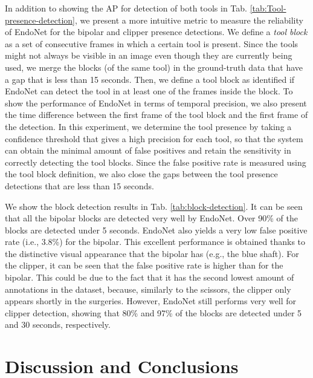 \documentclass[journal]{IEEEtran} \usepackage{amssymb}
\begin{document}
In addition to showing the AP for detection of both tools in Tab. \ref{tab:Tool-presence-detection}, 
we present a more intuitive metric to measure the reliability of EndoNet 
for the bipolar and clipper presence detections. We define a \textit{tool block} as a set of consecutive 
frames in which a certain tool is present.  Since the tools might not always 
be visible in an image even though they are currently being used, we merge the blocks (of the same tool) in the ground-truth data that have a gap that is less than 15 seconds. 
Then, we define a tool block as identified if EndoNet can detect the tool in 
at least one of the frames inside the block. To show the performance of 
EndoNet in terms of temporal precision, we also present the time difference between the 
first frame of the tool block and the first frame of the detection. 
In this experiment, we determine the tool presence by taking a confidence threshold that 
gives a high precision for each tool, so that the system can obtain the 
minimal amount of false positives and retain the sensitivity in correctly detecting 
the tool blocks. Since the false positive rate is measured using the tool block 
definition, we also close the gaps between the tool presence detections 
that are less than 15 seconds.

We show the block detection results in Tab. \ref{tab:block-detection}. 
It can be seen that all the bipolar blocks are detected very 
well by EndoNet. Over 90\% of the blocks are detected under 5 seconds. EndoNet also yields a very low false positive rate (i.e., 3.8\%) for the bipolar. 
This excellent performance is obtained thanks to the distinctive visual appearance that the bipolar has (e.g., the blue shaft). For the clipper, it can 
be seen that the false positive rate is higher than for the bipolar. This could 
be due to the fact that it has the second lowest amount of annotations 
in the dataset, because, similarly to the scissors, the clipper only appears shortly in the surgeries. However, EndoNet still performs very well for clipper detection, showing that 80\% and 97\% of the blocks are detected under 5 and 30 seconds, respectively.



\section{Discussion and Conclusions}
\end{document}
